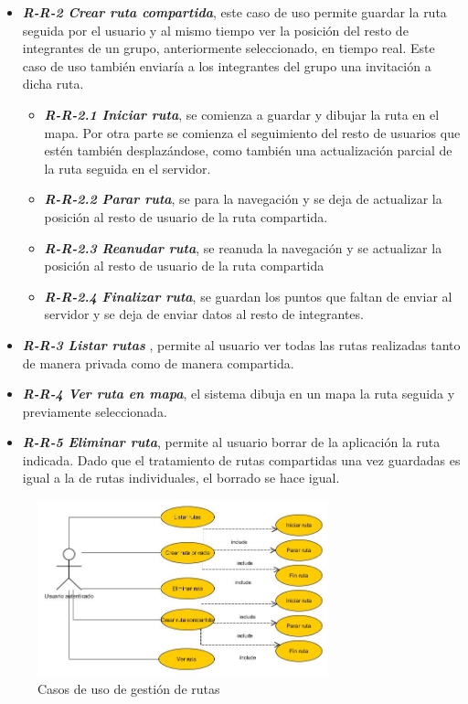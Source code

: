 \begin{itemize}
\begin{itemize}
\item \textbf{\textit{R-R-2 Crear ruta compartida}}, este caso de uso permite guardar la ruta seguida por el usuario y al mismo tiempo ver la posición del resto de integrantes de un grupo, anteriormente seleccionado, en tiempo real. Este caso de uso también enviaría a los integrantes del grupo una invitación a dicha ruta.
\begin{itemize}
\item \textbf{\textit{R-R-2.1 Iniciar ruta}}, se comienza a guardar y dibujar la ruta en el mapa. Por otra parte se comienza el seguimiento del resto de usuarios que estén también desplazándose, como también una actualización parcial de la ruta seguida en el servidor.
\item \textbf{\textit{R-R-2.2 Parar ruta}}, se para la navegación y se deja de actualizar la posición al resto de usuario de la ruta compartida.
\item \textbf{\textit{R-R-2.3 Reanudar ruta}}, se reanuda la navegación y se  actualizar la posición al resto de usuario de la ruta compartida
\item \textbf{\textit{R-R-2.4 Finalizar ruta}}, se guardan los puntos que faltan de enviar al servidor y se deja de enviar datos al resto de integrantes.
\end{itemize}
\item \textbf{\textit{R-R-3 Listar rutas} }, permite al usuario ver todas las rutas realizadas tanto de manera privada como de manera compartida.
\item \textbf{\textit{R-R-4 Ver ruta en mapa}}, el sistema dibuja en un mapa la ruta seguida y previamente seleccionada.
\item \textbf{\textit{R-R-5 Eliminar ruta}}, permite al usuario borrar de la aplicación la ruta indicada. Dado que el tratamiento de rutas compartidas una vez guardadas es igual a la de rutas individuales, el borrado se hace igual.

\end{itemize} 
\end{itemize}
\begin{figure}
		\centering
		\includegraphics[width=0.75\textwidth] {rutas.jpg}
		\caption{Casos de uso de gestión de rutas }
		\label{fig:rutas}
	\end{figure}



